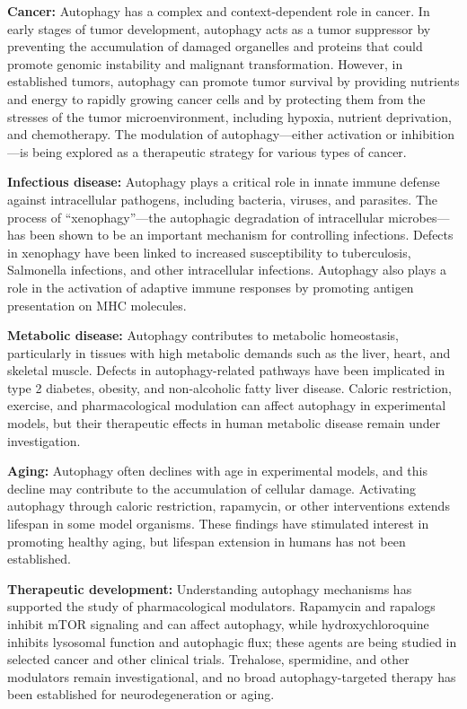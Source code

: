 \textbf{Cancer:} Autophagy has a complex and context-dependent role in cancer. In early stages of tumor development, autophagy acts as a tumor suppressor by preventing the accumulation of damaged organelles and proteins that could promote genomic instability and malignant transformation. However, in established tumors, autophagy can promote tumor survival by providing nutrients and energy to rapidly growing cancer cells and by protecting them from the stresses of the tumor microenvironment, including hypoxia, nutrient deprivation, and chemotherapy. The modulation of autophagy---either activation or inhibition---is being explored as a therapeutic strategy for various types of cancer.

\textbf{Infectious disease:} Autophagy plays a critical role in innate immune defense against intracellular pathogens, including bacteria, viruses, and parasites. The process of ``xenophagy''---the autophagic degradation of intracellular microbes---has been shown to be an important mechanism for controlling infections. Defects in xenophagy have been linked to increased susceptibility to tuberculosis, Salmonella infections, and other intracellular infections. Autophagy also plays a role in the activation of adaptive immune responses by promoting antigen presentation on MHC molecules.

\textbf{Metabolic disease:} Autophagy contributes to metabolic homeostasis, particularly in tissues with high metabolic demands such as the liver, heart, and skeletal muscle. Defects in autophagy-related pathways have been implicated in type 2 diabetes, obesity, and non-alcoholic fatty liver disease. Caloric restriction, exercise, and pharmacological modulation can affect autophagy in experimental models, but their therapeutic effects in human metabolic disease remain under investigation.

\textbf{Aging:} Autophagy often declines with age in experimental models, and this decline may contribute to the accumulation of cellular damage. Activating autophagy through caloric restriction, rapamycin, or other interventions extends lifespan in some model organisms. These findings have stimulated interest in promoting healthy aging, but lifespan extension in humans has not been established.

\textbf{Therapeutic development:} Understanding autophagy mechanisms has supported the study of pharmacological modulators. Rapamycin and rapalogs inhibit mTOR signaling and can affect autophagy, while hydroxychloroquine inhibits lysosomal function and autophagic flux; these agents are being studied in selected cancer and other clinical trials. Trehalose, spermidine, and other modulators remain investigational, and no broad autophagy-targeted therapy has been established for neurodegeneration or aging.


